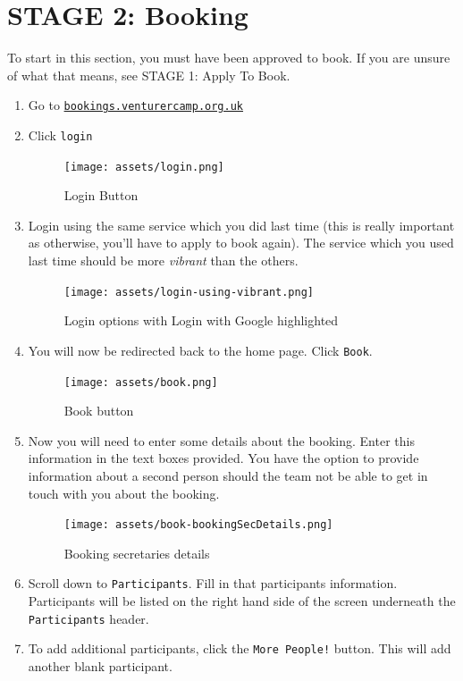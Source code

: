 \chapter{STAGE 2: Booking}
\label{chap:book}
To start in this section, you must have been approved to book. If you are unsure of what that means, see STAGE 1: Apply To Book.
\begin{enumerate}
    \item Go to \href{https://bookings.venturercamp.org.uk}{\texttt{bookings.venturercamp.org.uk}}
    \item Click \verb|login|
    \begin{figure}[H]
        \centering
        \texttt{[image: assets/login.png]}
        \caption{Login Button}
    \end{figure}
    \item Login using the same service which you did last time (this is really important as otherwise, you'll have to apply to book again). The service which you used last time should be more \emph{vibrant} than the others.
    \begin{figure}[H]
        \centering
        \texttt{[image: assets/login-using-vibrant.png]}
        \caption{Login options with Login with Google highlighted}
    \end{figure}
    \item You will now be redirected back to the home page. Click \verb|Book|.
    \begin{figure}[H]
        \centering
        \texttt{[image: assets/book.png]}
        \caption{Book button}
    \end{figure}
    \item Now you will need to enter some details about the booking. Enter this information in the text boxes provided. You have the option to provide information about a second person should the team not be able to get in touch with you about the booking.
    \begin{figure}[H]
        \centering
        \texttt{[image: assets/book-bookingSecDetails.png]}
        \caption{Booking secretaries details}
    \end{figure}
    \item Scroll down to \verb|Participants|. Fill in that participants information. Participants will be listed on the right hand side of the screen underneath the \verb|Participants| header.
    \item To add additional participants, click the \verb|More People!| button. This will add another blank participant.

\end{enumerate}
